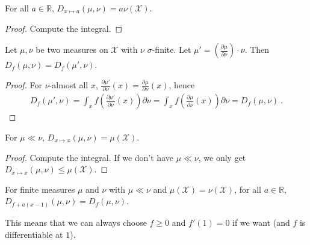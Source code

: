 \begin{lemma}
  \label{lem:fDiv_const}
  \leanok
  For all $a \in \mathbb{R}$, $D_{x \mapsto a}(\mu, \nu) = a \nu(\mathcal X)$.
\end{lemma}

\begin{proof} \leanok
Compute the integral.
\end{proof}

\begin{lemma}
  \label{lem:fDiv_eq_ac}
  \leanok
  Let $\mu, \nu$ be two measures on $\mathcal X$ with $\nu$ $\sigma$-finite. Let $\mu' = \left(\frac{\partial \mu}{\partial \nu}\right) \cdot \nu$.
  Then $D_f(\mu, \nu) = D_f(\mu', \nu)$.
\end{lemma}

\begin{proof} \leanok
For $\nu$-almost all $x$, $\frac{\partial \mu'}{\partial \nu}(x) = \frac{\partial \mu}{\partial \nu}(x)$, hence
\begin{align*}
D_f(\mu', \nu)
= \int_x f\left(\frac{\partial \mu'}{\partial \nu}(x)\right)\partial \nu
= \int_x f\left(\frac{\partial \mu}{\partial \nu}(x)\right)\partial \nu
= D_f(\mu, \nu)
\: .
\end{align*}
\end{proof}

\begin{lemma}
  \label{lem:fDiv_id}
  \leanok
  For $\mu \ll \nu$, $D_{x \mapsto x}(\mu, \nu) = \mu(\mathcal X)$.
\end{lemma}

\begin{proof} \leanok
Compute the integral. If we don't have $\mu \ll \nu$, we only get $D_{x \mapsto x}(\mu, \nu) \le \mu(\mathcal X)$.
\end{proof}

\begin{lemma}
  \label{lem:fDiv_add_linear}
  \leanok
  For finite measures $\mu$ and $\nu$ with $\mu \ll \nu$ and $\mu(\mathcal X) = \nu(\mathcal X)$, for all $a \in \mathbb{R}$, $D_{f + a(x - 1)}(\mu, \nu) = D_{f}(\mu, \nu)$.
\end{lemma}

This means that we can always choose $f \ge 0$ and $f'(1) = 0$ if we want (and $f$ is differentiable at $1$).

